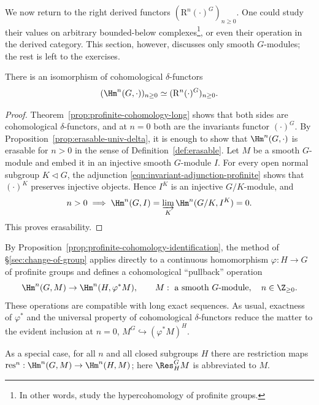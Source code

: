 We now return to the right derived functors
$(\mathrm{R}^n(\cdot)^G)_{n\geq0}$. One could study their values on arbitrary
bounded-below complexes\footnote{In other words, study the hypercohomology of
profinite groups.}, or even their operation in the derived category. This
section, however, discusses only smooth $G$-modules; the rest is left to the
exercises.

\begin{proposition}\label{prop:profinite-cohomology-identification}
	There is an isomorphism of cohomological $\delta$-functors
	\[ (\Hm^n(G,\cdot))_{n\geq0}
	\simeq(\mathrm{R}^n(\cdot)^G)_{n\geq0}. \]
\end{proposition}
\begin{proof}
	Theorem~\ref{prop:profinite-cohomology-long} shows that both sides are
	cohomological $\delta$-functors, and at $n=0$ both are the invariants
	functor $(\cdot)^G$. By Proposition~\ref{prop:erasable-univ-delta}, it is
	enough to show that $\Hm^n(G,\cdot)$ is erasable for $n>0$ in the sense
	of Definition~\ref{def:erasable}. Let $M$ be a smooth $G$-module and embed
	it in an injective smooth $G$-module $I$. For every open normal subgroup
	$K\lhd G$, the adjunction \eqref{eqn:invariant-adjunction-profinite}
	shows that $(\cdot)^K$ preserves injective objects. Hence $I^K$ is an
	injective $G/K$-module, and
	\[ n>0\implies\Hm^n(G,I)
	=\varinjlim_K\Hm^n(G/K,I^K)=0. \]
	This proves erasability.
\end{proof}

By Proposition~\ref{prop:profinite-cohomology-identification}, the method of
\S\ref{sec:change-of-group} applies directly to a continuous homomorphism
$\varphi:H\to G$ of profinite groups and defines a cohomological
``pullback'' operation
\[ \Hm^n(G,M)\to\Hm^n(H,\varphi^*M),\qquad
	M:\text{ a smooth $G$-module},\quad n\in\Z_{\geq0}. \]
These operations are compatible with long exact sequences. As usual, exactness
of $\varphi^*$ and the universal property of cohomological $\delta$-functors
reduce the matter to the evident inclusion at $n=0$,
$M^G\hookrightarrow(\varphi^*M)^H$.

As a special case, for all $n$ and all closed subgroups $H$ there are
restriction maps
$\mathrm{res}^n:\Hm^n(G,M)\to\Hm^n(H,M)$; here
$\Res^G_HM$ is abbreviated to $M$.

